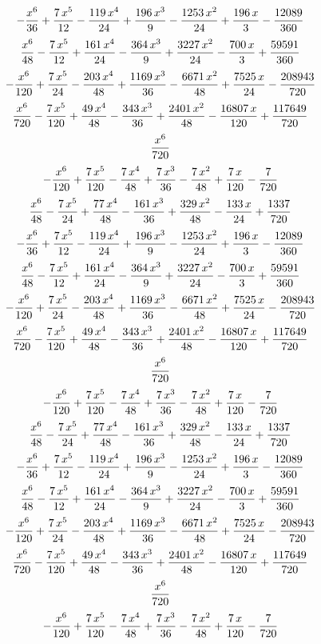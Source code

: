 $$-{{x^6}\over{36}}+{{7\,x^5}\over{12}}-{{119\,x^4}\over{24}}+{{196\,
 x^3}\over{9}}-{{1253\,x^2}\over{24}}+{{196\,x}\over{3}}-{{12089
 }\over{360}}$$
$${{x^6}\over{48}}-{{7\,x^5}\over{12}}+{{161\,x^4}\over{24}}-{{364\,x
 ^3}\over{9}}+{{3227\,x^2}\over{24}}-{{700\,x}\over{3}}+{{59591
 }\over{360}}$$
$$-{{x^6}\over{120}}+{{7\,x^5}\over{24}}-{{203\,x^4}\over{48}}+{{1169
 \,x^3}\over{36}}-{{6671\,x^2}\over{48}}+{{7525\,x}\over{24}}-{{
 208943}\over{720}}$$
$${{x^6}\over{720}}-{{7\,x^5}\over{120}}+{{49\,x^4}\over{48}}-{{343\,
 x^3}\over{36}}+{{2401\,x^2}\over{48}}-{{16807\,x}\over{120}}+{{
 117649}\over{720}}$$
$${{x^6}\over{720}}$$
$$-{{x^6}\over{120}}+{{7\,x^5}\over{120}}-{{7\,x^4}\over{48}}+{{7\,x^
 3}\over{36}}-{{7\,x^2}\over{48}}+{{7\,x}\over{120}}-{{7}\over{720}}$$
$${{x^6}\over{48}}-{{7\,x^5}\over{24}}+{{77\,x^4}\over{48}}-{{161\,x^
 3}\over{36}}+{{329\,x^2}\over{48}}-{{133\,x}\over{24}}+{{1337}\over{
 720}}$$
$$-{{x^6}\over{36}}+{{7\,x^5}\over{12}}-{{119\,x^4}\over{24}}+{{196\,
 x^3}\over{9}}-{{1253\,x^2}\over{24}}+{{196\,x}\over{3}}-{{12089
 }\over{360}}$$
$${{x^6}\over{48}}-{{7\,x^5}\over{12}}+{{161\,x^4}\over{24}}-{{364\,x
 ^3}\over{9}}+{{3227\,x^2}\over{24}}-{{700\,x}\over{3}}+{{59591
 }\over{360}}$$
$$-{{x^6}\over{120}}+{{7\,x^5}\over{24}}-{{203\,x^4}\over{48}}+{{1169
 \,x^3}\over{36}}-{{6671\,x^2}\over{48}}+{{7525\,x}\over{24}}-{{
 208943}\over{720}}$$
$${{x^6}\over{720}}-{{7\,x^5}\over{120}}+{{49\,x^4}\over{48}}-{{343\,
 x^3}\over{36}}+{{2401\,x^2}\over{48}}-{{16807\,x}\over{120}}+{{
 117649}\over{720}}$$
$${{x^6}\over{720}}$$
$$-{{x^6}\over{120}}+{{7\,x^5}\over{120}}-{{7\,x^4}\over{48}}+{{7\,x^
 3}\over{36}}-{{7\,x^2}\over{48}}+{{7\,x}\over{120}}-{{7}\over{720}}$$
$${{x^6}\over{48}}-{{7\,x^5}\over{24}}+{{77\,x^4}\over{48}}-{{161\,x^
 3}\over{36}}+{{329\,x^2}\over{48}}-{{133\,x}\over{24}}+{{1337}\over{
 720}}$$
$$-{{x^6}\over{36}}+{{7\,x^5}\over{12}}-{{119\,x^4}\over{24}}+{{196\,
 x^3}\over{9}}-{{1253\,x^2}\over{24}}+{{196\,x}\over{3}}-{{12089
 }\over{360}}$$
$${{x^6}\over{48}}-{{7\,x^5}\over{12}}+{{161\,x^4}\over{24}}-{{364\,x
 ^3}\over{9}}+{{3227\,x^2}\over{24}}-{{700\,x}\over{3}}+{{59591
 }\over{360}}$$
$$-{{x^6}\over{120}}+{{7\,x^5}\over{24}}-{{203\,x^4}\over{48}}+{{1169
 \,x^3}\over{36}}-{{6671\,x^2}\over{48}}+{{7525\,x}\over{24}}-{{
 208943}\over{720}}$$
$${{x^6}\over{720}}-{{7\,x^5}\over{120}}+{{49\,x^4}\over{48}}-{{343\,
 x^3}\over{36}}+{{2401\,x^2}\over{48}}-{{16807\,x}\over{120}}+{{
 117649}\over{720}}$$
$${{x^6}\over{720}}$$
$$-{{x^6}\over{120}}+{{7\,x^5}\over{120}}-{{7\,x^4}\over{48}}+{{7\,x^
 3}\over{36}}-{{7\,x^2}\over{48}}+{{7\,x}\over{120}}-{{7}\over{720}}$$
